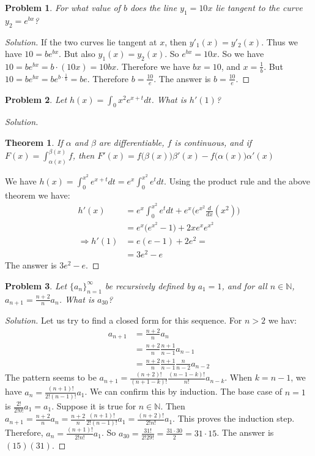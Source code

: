 \documentclass[oneside]{book}
\theoremstyle{mystyle}
\newtheorem{problem}{Problem}[section]
\newtheorem*{theorem*}{Theorem}
\begin{document}
\begin{problem}
For what value of $b$ does the line $y_1=10x$ lie tangent to the curve $y_2=e^{bx}$?
\end{problem}
\begin{proof}[Solution]
If the two curves lie tangent at $x$, then $y'_1(x) = y'_2(x)$. Thus we have $10 = be^{bx}$. But also $y_1(x) = y_2(x)$. So $e^{bx} = 10x$. So we have $10 = be^{bx} = b\cdot (10x) = 10bx$. Therefore we have $bx = 10$, and $x = \frac{1}{b}$. But $10 = b e^{bx} = b e^{b\cdot \frac{1}{b}} = be$. Therefore $b = \frac{10}{e}$. The answer is $b = \frac{10}{e}$.
\end{proof}
\begin{problem}
Let $h(x) = \int_{0}{x^2}e^{x+t}dt$. What is $h'(1)$?
\end{problem}
\begin{proof}[Solution]
\begin{theorem*}
If $\alpha$ and $\beta$ are differentiable, $f$ is continuous, and if $F(x) = \int_{\alpha(x)}^{\beta(x)}f$, then $F'(x) = f\big(\beta(x)\big)\beta'(x) - f\big(\alpha(x)\big)\alpha'(x)$
\end{theorem*}
We have $h(x) = \int_{0}^{x^2}e^{x+t}dt = e^x \int_{0}^{x^2}e^t dt$. Using the product rule and the above theorem we have:
\begin{align}
\nonumber h'(x) &= e^x \int_{0}^{x^2} e^t dt + e^{x} \big(e^{x^2}\frac{d}{dx}(x^2)\big) \\
\nonumber &= e^x\big(e^{x^2}-1\big) + 2xe^xe^{x^2} \\
\nonumber \Rightarrow h'(1) &= e(e-1) + 2e^2 = \\
\nonumber &= 3e^2 - e
\end{align}
The answer is $3e^2 - e$.
\end{proof}
\begin{problem}
Let $\{a_n\}_{n=1}^{\infty}$ be recursively defined by $a_1 = 1$, and for all $n\in \mathbb{N}$, $a_{n+1} = \frac{n+2}{n}a_n$. What is $a_{30}$?
\end{problem}
\begin{proof}[Solution]
Let us try to find a closed form for this sequence. For $n>2$ we hav:
\begin{align}
\nonumber a_{n+1} &= \frac{n+2}{n}a_n \\
\nonumber &= \frac{n+2}{n}\frac{n+1}{n-1}a_{n-1}\\
\nonumber &= \frac{n+2}{n}\frac{n+1}{n-1}\frac{n}{n-2}a_{n-2}
\end{align}
The pattern seems to be $a_{n+1} = \frac{(n+2)!}{(n+1-k)!}\frac{(n-1-k)!}{n!}a_{n-k}$. When $k=n-1$, we have $a_{n} = \frac{(n+1)!}{2!(n-1)!}a_1$. We can confirm this by induction. The base case of $n=1$ is $\frac{2!}{2!0!}a_1 = a_1$. Suppose it is true for $n\in \mathbb{N}$. Then $a_{n+1} = \frac{n+2}{n} a_n = \frac{n+2}{n} \frac{(n+1)!}{2!(n-1)!}a_1 = \frac{(n+2)!}{2!n!}a_1$. This proves the induction step. Therefore, $a_n = \frac{(n+1)!}{2!n!}a_1$. So $a_{30} = \frac{31!}{2!29!} = \frac{31\cdot 30}{2} = 31\cdot 15$. The answer is $(15)(31)$.
\end{proof}
\end{document}
